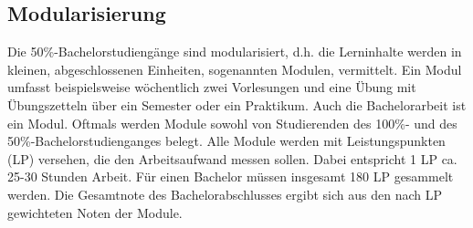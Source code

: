%
%
%
%
%
%


\subsection{Modularisierung}

Die 50\%-Bachelorstudiengänge sind modularisiert, d.h. die Lerninhalte werden
in kleinen, abgeschlossenen Einheiten, sogenannten Modulen, vermittelt. Ein
Modul umfasst beispielsweise wöchentlich zwei Vorlesungen und eine Übung mit
Übungszetteln über ein Semester oder ein Praktikum. Auch die Bachelorarbeit ist
ein Modul. Oftmals werden Module sowohl von Studierenden des 100\%- und des
50\%-Bachelorstudienganges belegt. Alle Module werden mit Leistungspunkten
(\gls{LP}) versehen, die den Arbeitsaufwand messen sollen.  Dabei entspricht 1
\gls{LP} ca. 25-30 Stunden Arbeit. Für einen Bachelor müssen insgesamt 180
\gls{LP} gesammelt werden. Die Gesamtnote des Bachelorabschlusses ergibt sich
aus den nach \gls{LP} gewichteten Noten der Module.

